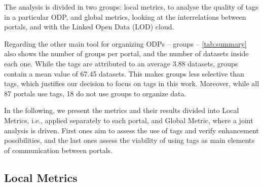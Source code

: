 
The analysis is divided in two groups: local metrics, to analyse the quality of tags in a particular ODP, and global metrics, looking at the interrelations between portals, and with the Linked Open Data (LOD) cloud.

Regarding the other main tool for organizing ODPs -- groups -- \autoref{tab:summary} also shows the number of groups per portal, and the number of datasets inside each one.
While the tags are attributed to an average 3.88 datasets, groups contain a mean value of 67.45 datasets.
This makes groups less selective than tags, which justifies our decision to focus on tags in this work.
Moreover, while all 87 portals use tags, 18 do not use groups to organize data.

In the following, we present the metrics and their results divided into Local Metrics, i.e., applied separately to each portal, and Global Metric, where a joint analysis is driven.
First ones aim to assess the use of tags and verify enhancement possibilities, and the last ones assess the viability of using tags as main elements of communication between portals.

\subsection{Local Metrics}
\label{sec:local_metrics}

